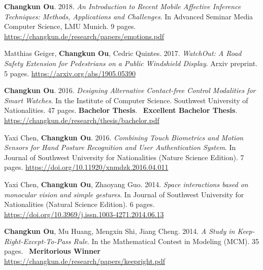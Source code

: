     \item{
        \textbf{Changkun Ou}. 2018.
        \emph{An Introduction to Recent Mobile Affective Inference Techniques: Methods, Applications and Challenges}.
        In Advanced Seminar Media Computer Science, LMU Munich. 9 pages.
        \url{https://changkun.de/research/papers/emotions.pdf}
    }
    \item{
        Matthias Geiger, \textbf{Changkun Ou}, Cedric Quintes. 2017.
        \emph{WatchOut: A Road Safety Extension for Pedestrians on a Public Windshield Display}.
        Arxiv preprint. 5 pages.
        \url{https://arxiv.org/abs/1905.05390}
    }
    \item{
        \textbf{Changkun Ou}. 2016.
        \emph{Designing Alternative Contact-free Control Modalities for Smart Watches}.
        In the Institute of Computer Science. Southwest University of Nationalities. 47 pages. \textbf{Bachelor Thesis}. \faAward~\textbf{Excellent Bachelor Thesis}.
        \url{https://changkun.de/research/thesis/bachelor.pdf}
    }
    \item{
        Yaxi Chen, \textbf{Changkun Ou}. 2016.
        \emph{Combining Touch Biometrics and Motion Sensors for Hand Posture Recognition and User Authentication System}.
        In Journal of Southwest University for Nationalities (Nature Science Edition). 7 pages.
        \url{https://doi.org/10.11920/xnmdzk.2016.04.011}
    }
    \item{
        Yaxi Chen, \textbf{Changkun Ou}, Zhaoyang Guo. 2014.
        \emph{Space interactions based on monocular vision and simple gestures}.
        In Journal of Southwest University for Nationalities (Natural Science Edition). 6 pages.
        \url{https://doi.org/10.3969/j.issn.1003-4271.2014.06.13}
    }
    \item{
        \textbf{Changkun Ou}, Mu Huang, Mengxin Shi, Jiang Cheng. 2014.
        \emph{A Study in Keep-Right-Except-To-Pass Rule}.
        In the Mathematical Contest in Modeling (MCM). 35 pages. \faAward~\textbf{Meritorious Winner}
        \url{https://changkun.de/research/papers/keepright.pdf}
    }
\resumeSubHeadingListEnd